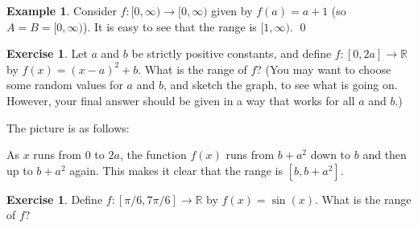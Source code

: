 \documentclass[a4paper]{book}
\newcommand{\R}         {{\mathbb{R}}}
\newcommand{\xra}       {\xrightarrow}
\renewcommand{\:}{\colon}
\theoremstyle{definition}
\newtheorem{example}[theorem]{Example}
\newtheorem{exercise}[theorem]{Exercise}
\renewenvironment{solution}{\SolutionInline}{\endSolutionInline}
\begin{document}
\begin{example}
 Consider $f\:[0,\infty)\xra{}[0,\infty)$ given by $f(a)=a+1$ (so
 $A=B=[0,\infty)$).  It is easy to see that the range is
 $[1,\infty)$. \qed 
\end{example}

\begin{exercise}
 Let $a$ and $b$ be strictly positive constants, and define
 $f\:[0,2a]\xra{}\R$ by $f(x)=(x-a)^2+b$.  What is the range of $f$?
 (You may want to choose some random values for $a$ and $b$, and sketch
 the graph, to see what is going on.  However, your final answer should
 be given in a way that works for all $a$ and $b$.)
\end{exercise}
\begin{solution}
 The picture is as follows:
 \begin{center}
 \end{center}
 As $x$ runs from $0$ to $2a$, the function $f(x)$ runs from $b+a^2$
 down to $b$ and then up to $b+a^2$ again.  This makes it clear that
 the range is $[b,b+a^2]$.
\end{solution}
\begin{exercise}
 Define $f\:[\pi/6,7\pi/6]\xra{}\R$ by $f(x)=\sin(x)$.  What is the
 range of $f$?
\end{exercise}
\end{document}
